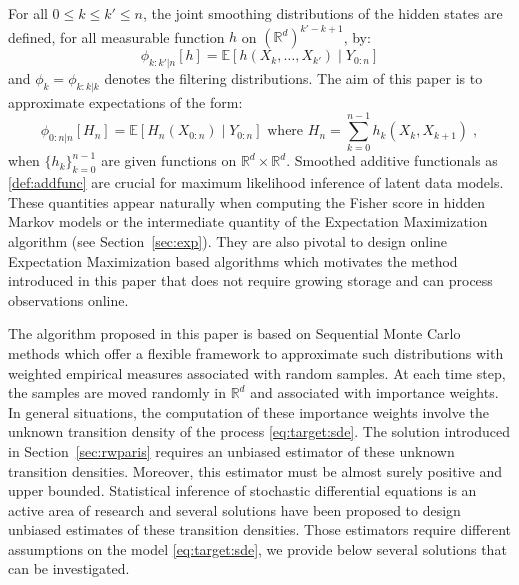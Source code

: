 \documentclass[12pt]{article}
\newcommand{\eqsp}{\;}
\newcommand{\1}{\mathrm{1}}
\begin{document}
For all $0 \leq k \leq k' \leq n$, the joint smoothing distributions of the hidden states are defined, for all measurable function $h$ on $(\mathbb{R}^d)^{k'-k + 1}$, by:
\[
\phi_{k:k'|n}[h] = \mathbb{E}\left[h(X_k,\ldots,X_{k'})\middle|Y_{0:n}\right]
\]
and $\phi_{k} = \phi_{k:k|k}$ denotes the filtering distributions. The aim of this paper is to approximate expectations of the form:
\begin{equation}
\label{def:addfunc}
\phi_{0:n\vert n}[H_{n}] = \mathbb{E}\left[H_n(X_{0:n})\middle|Y_{0:n}\right] \text{ where } H_n=\sum_{k=0}^{n-1}h_k(X_k,X_{k+1})\eqsp,
\end{equation}
when $\{h_k\}_{k=0}^{n-1}$ are given functions on $\mathbb{R}^d\times \mathbb{R}^d$. 
Smoothed additive functionals as \eqref{def:addfunc} are crucial for maximum likelihood inference of latent data models. 
These quantities appear naturally when computing the Fisher score in hidden Markov models or the intermediate quantity of the Expectation Maximization algorithm (see Section~\ref{sec:exp}). 
They are also pivotal to design online Expectation Maximization based algorithms which motivates the method introduced in this paper that does not require growing storage and can process observations online.

The algorithm proposed in this paper is based on Sequential Monte Carlo methods which offer a flexible framework to approximate such distributions with weighted empirical measures associated with random samples. 
At each time step, the samples are moved randomly in $\mathbb{R}^d$ and  associated with importance weights. 
In general situations, the computation of these importance weights involve the unknown transition density of the process \eqref{eq:target:sde}. 
The solution introduced in Section~\ref{sec:rwparis} requires an unbiased estimator of these unknown transition densities. Moreover, this estimator must be almost surely positive and upper bounded.
Statistical inference of stochastic differential equations is an active area of research and several solutions have been proposed to design unbiased estimates of these transition densities. 
Those estimators require different assumptions on the model \eqref{eq:target:sde}, we provide below several solutions that can be investigated.
\end{document}
